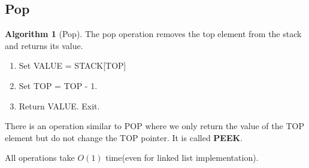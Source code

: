 \documentclass[10pt, a4paper]{extarticle}
\theoremstyle{definition}
\newtheorem{alg}{Algorithm}
\begin{document}
\subsection{Pop}
\begin{alg}[Pop]
	The pop operation removes the top element from the stack and returns its value.
	\begin{enumerate}
		\item Set VALUE = STACK[TOP]
		\item Set TOP = TOP - 1.
		\item Return VALUE. Exit.
	\end{enumerate}
	There is an operation similar to POP where we only return the value of the TOP element but do not change the TOP pointer. It is called \textbf{PEEK}.
\end{alg}

All operations take $O(1)$ time(even for linked list implementation).
\end{document}
